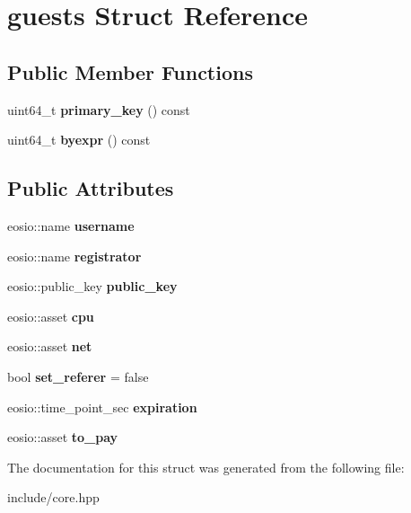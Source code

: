 \hypertarget{structguests}{}\section{guests Struct Reference}
\label{structguests}
\subsection*{Public Member Functions}
\begin{DoxyCompactItemize}
\item 
\mbox{\label{structguests_aa44a7691d4254e2f580a64791b061d70}} 
uint64\+\_\+t {\bfseries primary\+\_\+key} () const
\item 
\mbox{\label{structguests_a1f409e9372ba160ae769a2057decf311}} 
uint64\+\_\+t {\bfseries byexpr} () const
\end{DoxyCompactItemize}
\subsection*{Public Attributes}
\begin{DoxyCompactItemize}
\item 
\mbox{\label{structguests_a3c550ec3e80d040f7d95f7c9ee500dbe}} 
eosio\+::name {\bfseries username}
\item 
\mbox{\label{structguests_a22effafdbf30a59852f7f7cd82e7b531}} 
eosio\+::name {\bfseries registrator}
\item 
\mbox{\label{structguests_ad2754df2d77b869bd0c4e7e9cedad6a7}} 
eosio\+::public\+\_\+key {\bfseries public\+\_\+key}
\item 
\mbox{\label{structguests_ad1522a74eca90485897b549c857fa4b4}} 
eosio\+::asset {\bfseries cpu}
\item 
\mbox{\label{structguests_a36f81702c9834a45c9ecae49588b2e05}} 
eosio\+::asset {\bfseries net}
\item 
\mbox{\label{structguests_a201b3b738384f53f13965466ef3974d8}} 
bool {\bfseries set\+\_\+referer} = false
\item 
\mbox{\label{structguests_a33cb839d82a59aadd3dbc7879f8b56cf}} 
eosio\+::time\+\_\+point\+\_\+sec {\bfseries expiration}
\item 
\mbox{\label{structguests_a4ac3236a747b7c920f2675a9f8fe35da}} 
eosio\+::asset {\bfseries to\+\_\+pay}
\end{DoxyCompactItemize}


The documentation for this struct was generated from the following file\+:\begin{DoxyCompactItemize}
\item 
include/core.\+hpp\end{DoxyCompactItemize}
